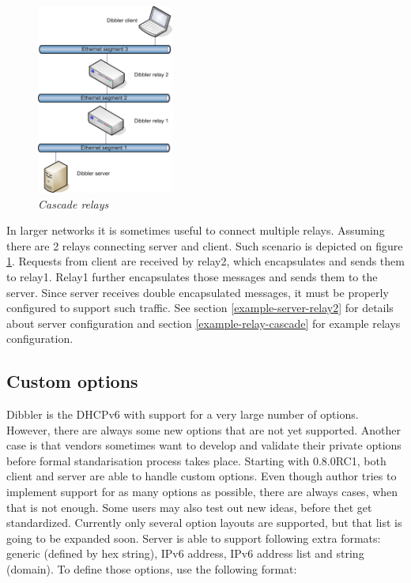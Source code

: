 \begin{figure}[ht]
\begin{center}
\includegraphics[width=0.4\textwidth]{dibbler-cascade-relays}
\caption{\emph{Cascade relays}}
\label{fig-cascade-relays}
\end{center}
\end{figure}

In larger networks it is sometimes useful to connect multiple
relays. Assuming there are 2 relays connecting server and client. Such
scenario is depicted on figure \ref{fig-cascade-relays}. Requests from
client are received by relay2, which encapsulates and sends them to
relay1. Relay1 further encapsulates those messages and sends them to
the server. Since server receives double encapsulated messages, it
must be properly configured to support such traffic. See section
\ref{example-server-relay2} for details about server configuration and 
section \ref{example-relay-cascade} for example relays configuration.

\subsection{Custom options}
\label{features-custom-options}
Dibbler is the DHCPv6 with support for a very large number of
options. However, there are always some new options that are not yet
supported. Another case is that vendors sometimes want to develop
and validate their private options before formal standarisation
process takes place. Starting with 0.8.0RC1, both client and server 
are able to handle custom options. Even though author tries to
implement support for as many options as possible, there are always
cases, when that is not 
enough. Some users may also test out new ideas, before thet get
standardized. Currently only several option layouts are supported, but
that list is going to be expanded soon. Server is able to support
following extra formats: generic (defined by hex string), IPv6
address, IPv6 address list and string (domain). To define those
options, use the following format:

